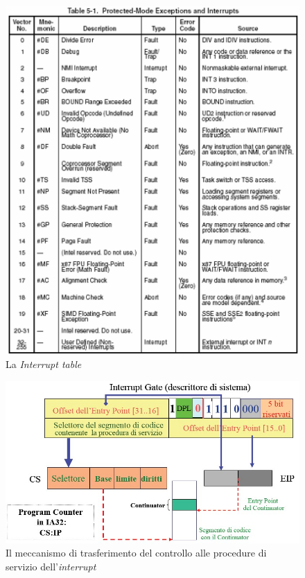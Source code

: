 \begin{figure}[!h]
\centering
\includegraphics[width=0.65\columnwidth]{img/interruptTable}
\caption{La \textit{Interrupt table}}
\label{fig:interruptTable}
\end{figure}

\begin{figure}[!h]
\centering
\includegraphics[width=0.75\columnwidth]{img/trasferimentoInterrupt}
\caption{Il meccanismo di trasferimento del controllo alle procedure di servizio dell'\textit{interrupt}}
\label{fig:trasferimentoInterrupt}
\end{figure}

